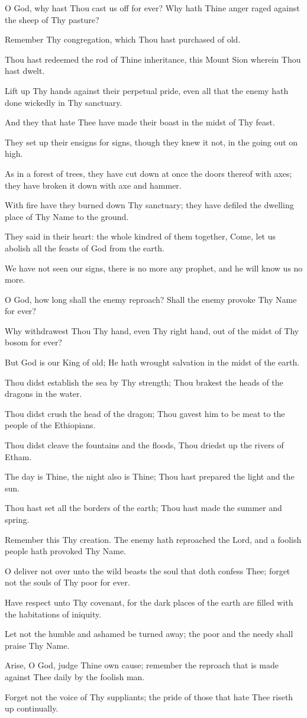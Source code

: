 O God, why hast Thou cast us off for ever? Why hath Thine anger raged against the sheep of Thy pasture?

Remember Thy congregation, which Thou hast purchased of old.

Thou hast redeemed the rod of Thine inheritance, this Mount Sion wherein Thou hast dwelt.

Lift up Thy hands against their perpetual pride, even all that the enemy hath done wickedly in Thy sanctuary.

And they that hate Thee have made their boast in the midst of Thy feast.

They set up their ensigns for signs, though they knew it not, in the going out on high.

As in a forest of trees, they have cut down at once the doors thereof with axes; they have broken it down with axe and hammer.

With fire have they burned down Thy sanctuary; they have defiled the dwelling place of Thy Name to the ground.

They said in their heart: the whole kindred of them together, Come, let us abolish all the feasts of God from the earth.

We have not seen our signs, there is no more any prophet, and he will know us no more.

O God, how long shall the enemy reproach? Shall the enemy provoke Thy Name for ever?

Why withdrawest Thou Thy hand, even Thy right hand, out of the midst of Thy bosom for ever?

But God is our King of old; He hath wrought salvation in the midst of the earth.

Thou didst establish the sea by Thy strength; Thou brakest the heads of the dragons in the water.

Thou didst crush the head of the dragon; Thou gavest him to be meat to the people of the Ethiopians.

Thou didst cleave the fountains and the floods, Thou driedst up the rivers of Etham.

The day is Thine, the night also is Thine; Thou hast prepared the light and the sun.

Thou hast set all the borders of the earth; Thou hast made the summer and spring.

Remember this Thy creation. The enemy hath reproached the Lord, and a foolish people hath provoked Thy Name.

O deliver not over unto the wild beasts the soul that doth confess Thee; forget not the souls of Thy poor for ever.

Have respect unto Thy covenant, for the dark places of the earth are filled with the habitations of iniquity.

Let not the humble and ashamed be turned away; the poor and the needy shall praise Thy Name.

Arise, O God, judge Thine own cause; remember the reproach that is made against Thee daily by the foolish man.

Forget not the voice of Thy suppliants; the pride of those that hate Thee riseth up continually.
